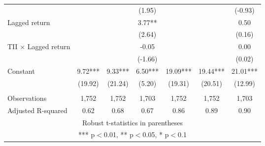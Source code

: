 \documentclass[]{article}
\begin{document}
\begin{tabular}{lcccccc}
 &  &  & (1.95) &  &  & (-0.93) \\
Lagged return &  &  & 3.77** &  &  & 0.50 \\
 &  &  & (2.64) &  &  & (0.16) \\
TII $\times$ Lagged return &  &  & -0.05 &  &  & 0.00 \\
 &  &  & (-1.66) &  &  & (0.02) \\
Constant & 9.72*** & 9.33*** & 6.50*** & 19.09*** & 19.44*** & 21.01*** \\
 & (19.92) & (21.24) & (5.20) & (19.31) & (20.51) & (12.99) \\
 &  &  &  &  &  &  \\
Observations & 1,752 & 1,752 & 1,703 & 1,752 & 1,752 & 1,703 \\
 Adjusted R-squared & 0.62 & 0.68 & 0.67 & 0.86 & 0.89 & 0.90 \\ \hline
\multicolumn{7}{c}{ Robust t-statistics in parentheses} \\
\multicolumn{7}{c}{ *** p$<$0.01, ** p$<$0.05, * p$<$0.1} \\
\end{tabular}
\end{document}
